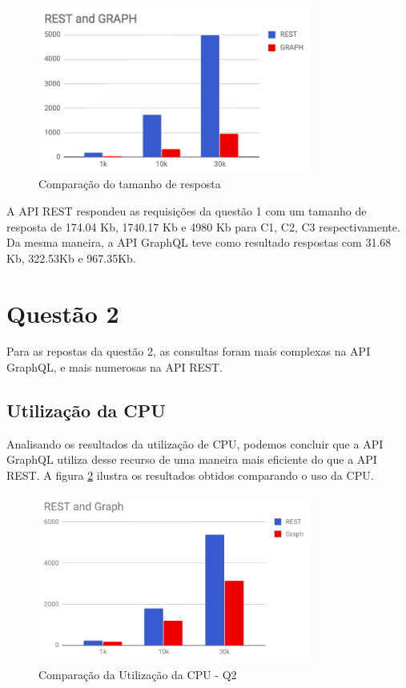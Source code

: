 \begin{figure}[htbp]
    \centering
    \includegraphics[width=0.8\textwidth]{figuras/Q1-size.png}
    \caption{Comparação do tamanho de resposta}
    \label{fig:q1-size}
    \author{fonte: Autor}
\end{figure}

A API REST respondeu as requisições da questão 1 com um tamanho de resposta de 174.04 Kb, 1740.17 Kb e 4980 Kb para C1, C2, C3 respectivamente. Da mesma maneira, a API GraphQL teve como resultado respostas com 31.68 Kb, 322.53Kb e 967.35Kb. 


\section{Questão 2}

Para as repostas da questão 2, as consultas foram mais complexas na API GraphQL, e mais numerosas na API REST. 

\subsection{Utilização da CPU}

Analisando os resultados da utilização de CPU, podemos concluir que a API GraphQL utiliza desse recurso de uma maneira mais eficiente do que a API REST. A figura \ref{fig:q2-cpu} ilustra os resultados obtidos comparando o uso da CPU.

\begin{figure}[htbp]
    \centering
    \includegraphics[width=0.8\textwidth]{figuras/q2-cpu.png}
    \caption{Comparação da Utilização da CPU - Q2}
    \label{fig:q2-cpu}
    \author{fonte: Autor}
\end{figure}

